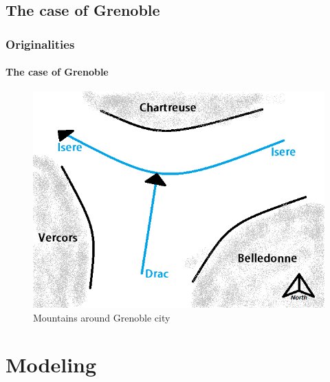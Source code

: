 \documentclass{beamer}
\begin{document}
	\subsection{The case of Grenoble}
	\begin{frame}
		\frametitle{Originalities}
		\framesubtitle{The case of Grenoble}
		\begin{figure}
		\centering
			\includegraphics[height=0.5\textwidth]{img/i_grenoble.png}
		\caption{Mountains around Grenoble city}
		\label{fig:Mountains around Grenoble city}
	\end{figure}
	\end{frame}
	\section{Modeling}
\end{document}
